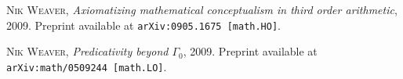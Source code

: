 \documentclass[bsl,meeting]{asl}
\begin{document}
\begin{thebibliography}{10}

  {\scshape Nik Weaver},
  {\itshape Axiomatizing mathematical conceptualism in third order arithmetic}, 2009.
  Preprint available at \texttt{arXiv:0905.1675 [math.HO]}.

  {\scshape Nik Weaver},
  {\itshape Predicativity beyond {$\Gamma_0$}},
  2009.
  Preprint available at \texttt{arXiv:math/0509244 [math.LO]}.

\end{thebibliography}

\vspace*{-0.5\baselineskip}
\end{document}
